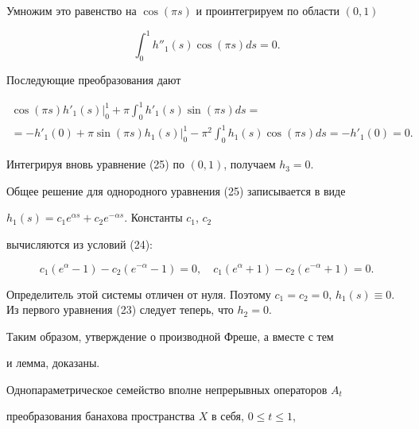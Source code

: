 \begin{pf}
\begin{equation}
\end{equation}


Умножим это равенство на $\cos(\pi s)$ и проинтегрируем по области $(0,1)$


$$


\int_{0}^{1} h''_1(s) \cos(\pi s) ds=0.


$$


Последующие преобразования дают


\begin{multline*}


\cos(\pi s) h'_1(s) \big|_0^1+


\pi \int_{0}^{1} h'_1(s) \sin(\pi s) ds=\\


%


=- h'_1(0) + \pi \sin(\pi s) h_1(s) \big|_0^1 -


\pi^2 \int_{0}^{1} {} h_1(s) \cos(\pi s) ds=- h'_1(0)=0.


\end{multline*}


Интегрируя вновь уравнение (25) по $(0,1)$, получаем $h_3=0$.





Общее решение для однородного уравнения (25) записывается в виде


$h_1(s)=c_1 e^{\alpha s}+c_2 e^{-\alpha s}$. Константы $c_1$, $c_2$


вычисляются из условий (24):


$$


c_1 ({e^{\alpha}-1}) - c_2 ({e^{-\alpha}-1})=0, \quad


c_1 ({e^{\alpha}+1}) - c_2 ({e^{-\alpha}+1})=0.


$$


Определитель этой системы отличен от нуля. Поэтому $c_1=c_2=0$, $h_1(s)


\equiv 0$. Из первого уравнения (23) следует теперь, что $h_2=0$.


Таким образом, утверждение о производной Фреше, а вместе с тем


и лемма, доказаны.


\end{pf}





Однопараметрическое семейство вполне непрерывных операторов $A_t$


преобразования банахова пространства $X$ в себя, $0 \le t \le 1$,



